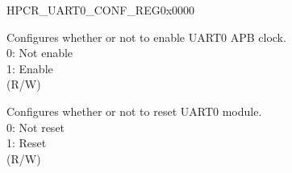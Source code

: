 \begin{register}{H}{PCR\_UART0\_CONF\_REG}{0x0000}\label{regdesc:PCRUART0CONFREG}
%
%
%
\regnewline%
\begin{regdesc}\begin{reglist}
\label{fielddesc:PCRUART0CLKEN}\item [PCR\_UART0\_CLK\_EN] Configures whether or not to enable UART0 APB clock.\\
0: Not enable\\
1: Enable\\ (R/W)
\label{fielddesc:PCRUART0RSTEN}\item [PCR\_UART0\_RST\_EN] Configures whether or not to reset UART0 module.\\
0: Not reset\\
1: Reset\\
(R/W)
\end{reglist}\end{regdesc}
\end{register}


